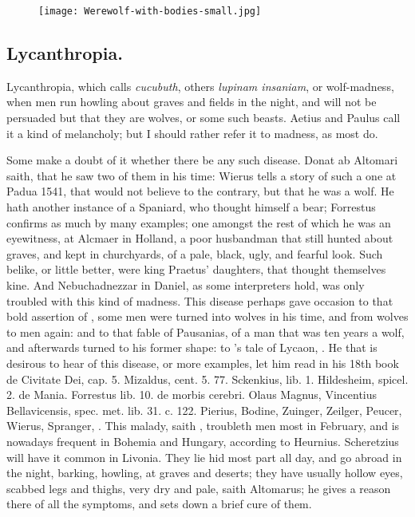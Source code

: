 {\cleartoleftpage{}
\begin{figure}[p]
  \begingroup
  \centering
  \texttt{[image: Werewolf-with-bodies-small.jpg]}
  \label{fig:werewolf}
\end{figure}

\clearpage{}
\subsection{Lycanthropia.}
Lycanthropia, which \Avicenna{} calls \emph{cucubuth}, others
\emph{lupinam insaniam}, or wolf-madness, when men run howling about graves
and fields in the night, and will not be persuaded but that they are
wolves, or some such beasts. Aetius and Paulus call it a kind
of melancholy; but I should rather refer it to madness, as most do.

Some make a doubt of it whether there be any such disease. Donat
ab Altomari saith, that he saw two of them in his time: Wierus
tells a story of such a one at Padua 1541, that would not believe to
the contrary, but that he was a wolf. He hath another instance of a
Spaniard, who thought himself a bear; Forrestus confirms as much
by many examples; one amongst the rest of which he was an eyewitness,
at Alcmaer in Holland, a poor husbandman that still hunted about
graves, and kept in churchyards, of a pale, black, ugly, and fearful
look. Such belike, or little better, were king Praetus' daughters,
that thought themselves kine. And Nebuchadnezzar in Daniel, as some
interpreters hold, was only troubled with this kind of madness. This
disease perhaps gave occasion to that bold assertion of \Pliny{},
some men were turned into wolves in his time, and from wolves to men
again: and to that fable of Pausanias, of a man that was ten years a
wolf, and afterwards turned to his former shape: to \Ovid's tale of
Lycaon, \etc{}. He that is desirous to hear of this disease, or more
examples, let him read \Austin{} in his 18th book de Civitate Dei, cap. 5.
Mizaldus, cent. 5. 77. Sckenkius, lib. 1. Hildesheim, spicel. 2. de
Mania. Forrestus lib. 10. de morbis cerebri. Olaus Magnus, Vincentius
Bellavicensis, spec. met. lib. 31. c. 122. Pierius, Bodine, Zuinger,
Zeilger, Peucer, Wierus, Spranger, \etc{}. This malady, saith \Avicenna{},
troubleth men most in February, and is nowadays frequent in Bohemia and
Hungary, according to Heurnius. Scheretzius will have it common in
Livonia. They lie hid most part all day, and go abroad in the night,
barking, howling, at graves and deserts; they have usually hollow
eyes, scabbed legs and thighs, very dry and pale, saith Altomarus;
he gives a reason there of all the symptoms, and sets down a brief cure
of them.

}

